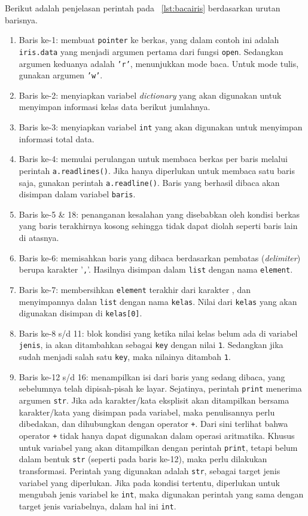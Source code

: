Berikut adalah penjelasan perintah pada \lstlistingname~\ref{lst:bacairis} berdasarkan urutan barisnya.
\begin{enumerate}
  \item Baris ke-1: membuat \texttt{pointer} ke berkas, yang dalam contoh ini adalah \texttt{iris.data} yang menjadi argumen pertama dari fungsi \texttt{open}. Sedangkan argumen keduanya adalah \texttt{'r'}, menunjukkan mode baca. Untuk mode tulis, gunakan argumen \texttt{'w'}.
  \item Baris ke-2: menyiapkan variabel \textit{dictionary} yang akan digunakan untuk menyimpan informasi kelas data berikut jumlahnya.
  \item Baris ke-3: menyiapkan variabel \texttt{int} yang akan digunakan untuk menyimpan informasi total data.
  \item Baris ke-4: memulai perulangan untuk membaca berkas per baris melalui perintah \texttt{a.readlines()}. Jika hanya diperlukan untuk membaca satu baris saja, gunakan perintah \texttt{a.readline()}. Baris yang berhasil dibaca akan disimpan dalam variabel \texttt{baris}.
  \item Baris ke-5 \& 18: penanganan kesalahan yang disebabkan oleh kondisi berkas yang baris terakhirnya kosong sehingga tidak dapat diolah seperti baris lain di atasnya.
  \item Baris ke-6: memisahkan baris yang dibaca berdasarkan pembatas (\textit{delimiter}) berupa karakter '\texttt{,}'. Hasilnya disimpan dalam \texttt{list} dengan nama \texttt{element}.
  \item Baris ke-7: membersihkan \texttt{element} terakhir dari karakter , dan menyimpannya dalan \texttt{list} dengan nama \texttt{kelas}. Nilai dari \texttt{kelas} yang akan digunakan disimpan di \texttt{kelas[0]}.
  \item Baris ke-8 s/d 11: blok kondisi yang ketika nilai kelas belum ada di variabel \texttt{jenis}, ia akan ditambahkan sebagai \texttt{key} dengan nilai \texttt{1}. Sedangkan jika sudah menjadi salah satu \texttt{key}, maka nilainya ditambah \texttt{1}.
  \item Baris ke-12 s/d 16: menampilkan isi dari baris yang sedang dibaca, yang sebelumnya telah dipisah-pisah ke layar. Sejatinya, perintah \texttt{print} menerima argumen \texttt{str}. Jika ada karakter/kata eksplisit akan ditampilkan bersama karakter/kata yang disimpan pada variabel, maka penulisannya perlu dibedakan, dan dihubungkan dengan operator \texttt{+}. Dari sini terlihat bahwa operator \texttt{+} tidak hanya dapat digunakan dalam operasi aritmatika. Khusus untuk variabel yang akan ditampilkan dengan perintah \texttt{print}, tetapi belum dalam bentuk \texttt{str} (seperti pada baris ke-12), maka perlu dilakukan transformasi. Perintah yang digunakan adalah \texttt{str}, sebagai target jenis variabel yang diperlukan. Jika pada kondisi tertentu, diperlukan untuk mengubah jenis variabel ke \texttt{int}, maka digunakan perintah yang sama dengan target jenis variabelnya, dalam hal ini \texttt{int}.

\end{enumerate}
